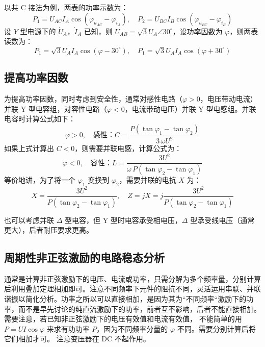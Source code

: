 \documentclass[a4paper]{article}  %
\theoremstyle{MyLineTheoremStyle} %
\theoremstyle{MyBlockTheoremStyle} %
\theoremstyle{MySubsubsectionStyle} %
\begin{document}
\begin{multicols*}{4}
以共 C 接法为例，两表的功率示数为：
\begin{equation}
P_1 = U_{AC} I_A \cos (\varphi_{u_{AC}} - \varphi_{i_A}), \quad 
P_2 = U_{BC} I_B \cos (\varphi_{u_{BC}} - \varphi_{i_B})
\end{equation}
设 $Y$ 型电源下的 $\dot{U}_A$，$\dot{I}_A$ 已知，则 $\dot{U_{AB}} = \sqrt{3} U_A \angle 30^\circ$，设功率因数为 $\varphi$，则两表读数为：
\begin{equation}
P_1 = \sqrt{3} U_A I_A \cos (\varphi - 30^\circ)
,\quad 
P_1 = \sqrt{3} U_A I_A \cos (\varphi + 30^\circ)
\end{equation}


\subsection{提高功率因数}

为提高功率因数，同时考虑到安全性，通常对感性电路（$\varphi > 0$，电压带动电流）并联 Y 型电容组，对容性电路（$\varphi < 0$，电流带动电压）并联 Y 型电感组。并联电容时计算公式如下：
\begin{equation}
\varphi > 0,\quad \text{感性：}
C = \frac{P(\tan \varphi_1 - \tan \varphi_2)}{3\,\omega U^2}
\end{equation}
如果上式计算出 $C < 0$，则需要并联电感，计算公式为：
\begin{equation}
\varphi < 0,\quad \text{容性：}
L = \frac{3 U^2}{\omega \, P (\tan \varphi_2 - \tan \varphi_1)}
\end{equation}
等价地讲，为了将一个 $\varphi_1$ 变换到 $\varphi_2$，需要并联的电抗 $X$ 为：
\begin{equation}
X = \frac{3 U^2}{P (\tan \varphi_2 - \tan \varphi_1)},\quad 
Z = j X = j \frac{3 U^2}{P (\tan \varphi_2 - \tan \varphi_1)} 
\end{equation}

也可以考虑并联 $\Delta$ 型电容，但 Y 型时电容承受相电压，$\Delta$ 型承受线电压（通常更大），后者耐压要求更高。


\subsection{周期性非正弦激励的电路稳态分析}

通常是计算非正弦激励下的电压、电流或功率，只需分解为多个频率量，分别计算后利用叠加定理相加即可。注意不同频率下元件的阻抗不同，灵活运用串联、并联谐振以简化分析。功率之所以可以直接相加，是因为其为“不同频率“激励下的功率，而不是早先讨论的纯直流激励下的功率，前者互不影响，后者不能直接相加。需要注意，若已知非正弦激励下的电压有效值和电流有效值，{\color{red} 不能简单的用 $P = U I \cos \varphi$ 来求有功功率 $P$}，因为不同频率分量的 $\varphi$ 不同。需要分别计算后将它们相加才可。{\color{red} 注意变压器在 DC 不起作用}。



\end{multicols*}
\end{document}
